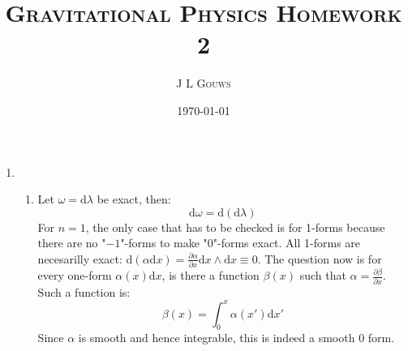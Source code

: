 \documentclass[12pt,a4]{article}
\title{
\textsc{Gravitational Physics Homework 2}
}
\author{\textsc{J L Gouws}
}
\date{\today
\\[1cm]}
\newcommand{\e}{\mathrm{d}}
\begin{document}
\thispagestyle{empty}

\maketitle

\begin{enumerate}
  \item
    \begin{enumerate}
      \item
        Let $\omega = \e \lambda$ be exact, then:
        \begin{equation*}
          \e \omega = \e( \e \lambda )
        \end{equation*}
        For $n = 1$, the only case that has to be checked is for 1-forms because there are no "$-1$"-forms to make "0"-forms exact.
        All 1-forms are necesarilly exact: $\e (\alpha \e x) = \frac{\partial \alpha}{\partial x} \e x \wedge \e x \equiv 0$.
        The question now is for every one-form $\alpha(x) \e x$, is there a function $\beta(x)$ such that $\alpha = \frac{\partial \beta}{\partial x}$.
        Such a function is:
        \begin{equation*}
          \beta(x) = \int_0^x \alpha(x') \e x'
        \end{equation*}
        Since $\alpha$ is smooth and hence integrable, this is indeed a smooth $0$ form.


\end{enumerate}
\end{enumerate}
\end{document}
